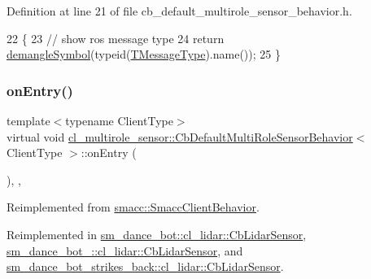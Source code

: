 Definition at line 21 of file cb\+\_\+default\+\_\+multirole\+\_\+sensor\+\_\+behavior.\+h.


\begin{DoxyCode}
22   \{
23     \textcolor{comment}{// show ros message type}
24     \textcolor{keywordflow}{return} \hyperlink{namespacesmacc_1_1introspection_a2f495108db3e57604d8d3ff5ef030302}{demangleSymbol}(\textcolor{keyword}{typeid}(\hyperlink{classcl__multirole__sensor_1_1CbDefaultMultiRoleSensorBehavior_aa23bc8c99de1eddad01d094bdab62aa4}{TMessageType}).name());
25   \}
\end{DoxyCode}
\mbox{\label{classcl__multirole__sensor_1_1CbDefaultMultiRoleSensorBehavior_a5ac29f93cc91e23715f51ade94467cae}} 
\subsubsection{\texorpdfstring{on\+Entry()}{onEntry()}}
{\footnotesize\ttfamily template$<$typename Client\+Type$>$ \\
virtual void \hyperlink{classcl__multirole__sensor_1_1CbDefaultMultiRoleSensorBehavior}{cl\+\_\+multirole\+\_\+sensor\+::\+Cb\+Default\+Multi\+Role\+Sensor\+Behavior}$<$ Client\+Type $>$\+::on\+Entry (\begin{DoxyParamCaption}{ }\end{DoxyParamCaption})\hspace{0.3cm}{\ttfamily [inline]}, {\ttfamily [override]}, {\ttfamily [virtual]}}



Reimplemented from \hyperlink{classsmacc_1_1SmaccClientBehavior_a7962382f93987c720ad432fef55b123f}{smacc\+::\+Smacc\+Client\+Behavior}.



Reimplemented in \hyperlink{structsm__dance__bot_1_1cl__lidar_1_1CbLidarSensor_aad3468a6ae78999c9fd01bdb81b42a49}{sm\+\_\+dance\+\_\+bot\+::cl\+\_\+lidar\+::\+Cb\+Lidar\+Sensor}, \hyperlink{structsm__dance__bot__2_1_1cl__lidar_1_1CbLidarSensor_aad4085c114dd98c5e857d1a71c0309f8}{sm\+\_\+dance\+\_\+bot\+\_\+::cl\+\_\+lidar\+::\+Cb\+Lidar\+Sensor}, and \hyperlink{structsm__dance__bot__strikes__back_1_1cl__lidar_1_1CbLidarSensor_a82d0250dcf2d4e9b12ccd528a5d87002}{sm\+\_\+dance\+\_\+bot\+\_\+strikes\+\_\+back\+::cl\+\_\+lidar\+::\+Cb\+Lidar\+Sensor}.



